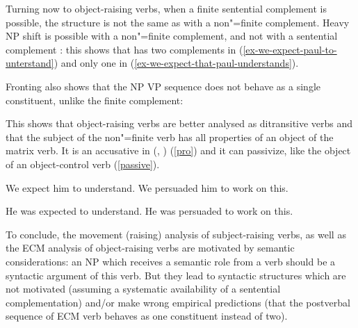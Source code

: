 Turning now to object-raising verbs, when a finite sentential complement is possible, the structure
is not the same as  with a non"=finite complement. Heavy NP shift is possible with a non"=finite
complement, and not with a sentential complement \parencites[]{Bresnan1982}[]{PollardandSag1994}: this shows that  has two complements in (\ref{ex-we-expect-paul-to-unterstand}) and only one in (\ref{ex-we-expect-that-paul-understands}).

\eal
{}
\zl

Fronting also shows that the NP VP sequence does not behave as a single constituent, unlike the finite complement:

\eal
{}
\zl


This shows that object-raising verbs are better analysed as ditransitive verbs and that the subject of the non"=finite verb has all properties of an object of the matrix verb. It is an accusative in  (, ) (\ref{pro}) and it can passivize, like the object of an object-control verb (\ref{passive}).

\begin{exe}
\ex
\begin{xlist} \label{pro}
\ex We expect him to understand.
\ex  We persuaded him to work on this.
\end{xlist}
\ex \begin{xlist} \label{passive}
\ex  He was expected to understand.
\ex  He was persuaded to work on this.
\end{xlist}
	
\end{exe}


To conclude, the movement (raising) analysis of subject-raising verbs, as well as the ECM analysis of object-raising verbs are motivated by semantic considerations: an NP which receives a semantic role from a verb should be a syntactic argument of this verb. But they lead to syntactic structures which are not motivated (assuming a systematic availability of a sentential complementation) and/or make wrong empirical predictions (that the postverbal sequence of ECM verb behaves as one constituent instead of two).
 
